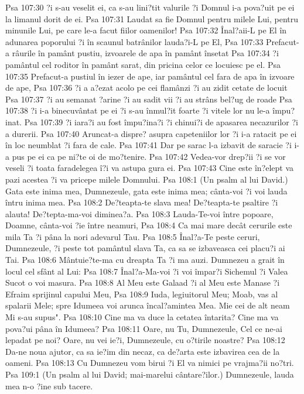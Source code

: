 Psa 107:30  ?i s-au veselit ei, ca s-au lini?tit valurile ?i Domnul i-a pova?uit pe ei la limanul dorit de ei.
Psa 107:31  Laudat sa fie Domnul pentru milele Lui, pentru minunile Lui, pe care le-a facut fiilor oamenilor!
Psa 107:32  Înal?aii-L pe El în adunarea poporului ?i în scaunul batrânilor lauda?i-L pe El,
Psa 107:33  Prefacut-a râurile în pamânt pustiu, izvoarele de apa în pamânt însetat
Psa 107:34  ?i pamântul cel roditor în pamânt sarat, din pricina celor ce locuiesc pe el.
Psa 107:35  Prefacut-a pustiul în iezer de ape, iar pamântul cel fara de apa în izvoare de ape,
Psa 107:36  ?i a a?ezat acolo pe cei flamânzi ?i au zidit cetate de locuit
Psa 107:37  ?i au semanat ?arine ?i au sadit vii ?i au strâns bel?ug de roade
Psa 107:38  ?i i-a binecuvântat pe ei ?i s-au înmul?it foarte ?i vitele lor nu le-a împu?inat.
Psa 107:39  ?i iara?i au fost împu?ina?i ?i chinui?i de apasarea necazurilor ?i a durerii.
Psa 107:40  Aruncat-a dispre? asupra capeteniilor lor ?i i-a ratacit pe ei în loc neumblat ?i fara de cale.
Psa 107:41  Dar pe sarac l-a izbavit de saracie ?i i-a pus pe ei ca pe ni?te oi de mo?tenire.
Psa 107:42  Vedea-vor drep?ii ?i se vor veseli ?i toata faradelegea î?i va astupa gura ei.
Psa 107:43  Cine este în?elept va pazi acestea ?i va pricepe milele Domnului.
Psa 108:1  (Un psalm al lui David.) Gata este inima mea, Dumnezeule, gata este inima mea; cânta-voi ?i voi lauda întru inima mea.
Psa 108:2  De?teapta-te slava mea! De?teapta-te psaltire ?i alauta! De?tepta-ma-voi diminea?a.
Psa 108:3  Lauda-Te-voi între popoare, Doamne, cânta-voi ?ie între neamuri,
Psa 108:4  Ca mai mare decât cerurile este mila Ta ?i pâna la nori adevarul Tau.
Psa 108:5  Înal?a-Te peste ceruri, Dumnezeule, ?i peste tot pamântul slava Ta, ca sa se izbaveasca cei placu?i ai Tai.
Psa 108:6  Mântuie?te-ma cu dreapta Ta ?i ma auzi. Dumnezeu a grait în locul cel sfânt al Lui:
Psa 108:7  Înal?a-Ma-voi ?i voi împar?i Sichemul ?i Valea Sucot o voi masura.
Psa 108:8  Al Meu este Galaad ?i al Meu este Manase ?i Efraim sprijinul capului Meu,
Psa 108:9  Iuda, legiuitorul Meu; Moab, vas al spalarii Mele; spre Idumeea voi arunca încal?amintea Mea. Mie cei de alt neam Mi s-au supus".
Psa 108:10  Cine ma va duce la cetatea întarita? Cine ma va pova?ui pâna în Idumeea?
Psa 108:11  Oare, nu Tu, Dumnezeule, Cel ce ne-ai lepadat pe noi? Oare, nu vei ie?i, Dumnezeule, cu o?tirile noastre?
Psa 108:12  Da-ne noua ajutor, ca sa ie?im din necaz, ca de?arta este izbavirea cea de la oameni.
Psa 108:13  Cu Dumnezeu vom birui ?i El va nimici pe vrajma?ii no?tri.
Psa 109:1  (Un psalm al lui David; mai-marelui cântare?ilor.) Dumnezeule, lauda mea n-o ?ine sub tacere.
